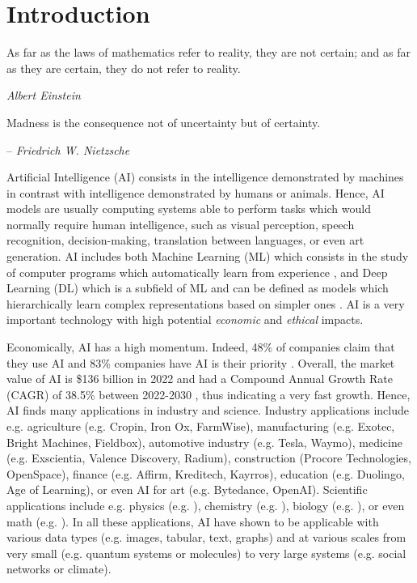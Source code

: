 \chapter{Introduction}
\label{chap:introduction}

\epigraph{As far as the laws of mathematics refer to reality, they are not certain; and as far as they are certain, they do not refer to reality.}{\textit{Albert Einstein}}

\epigraph{Madness is the consequence not of uncertainty but of certainty.}{-- \textit{Friedrich W. Nietzsche}}

Artificial Intelligence (AI) consists in the intelligence demonstrated by machines in contrast with intelligence demonstrated by humans or animals. 
Hence, AI models are usually computing systems able to perform tasks which would normally require human intelligence, such as visual perception, speech recognition, decision-making, translation between languages, or even art generation.
AI includes both Machine Learning (ML) which consists in the study of computer programs which automatically learn from experience \citep{Mitchell97}, and Deep Learning (DL) which is a subfield of ML and can be defined as models which hierarchically learn complex representations based on simpler ones \citep{GoodBengCour16}.
AI is a very important technology with high potential \emph{economic} and \emph{ethical} impacts. 

Economically, AI has a high momentum. Indeed, 48\% of companies claim that they use AI \cite{ai-market-oreilly} and 83\% companies have AI is their priority \cite{ai-market-forbes}. Overall, the market value of AI is \$136 billion in 2022 \cite{ai-market} and had a Compound Annual Growth Rate (CAGR) of 38.5\% between 2022-2030 \cite{ai-market}, thus indicating a very fast growth.
Hence, AI finds many applications in industry and science. 
Industry applications include e.g. agriculture (e.g. Cropin, Iron Ox, FarmWise), manufacturing (e.g. Exotec, Bright Machines, Fieldbox), automotive industry (e.g. Tesla, Waymo), medicine (e.g. Exscientia, Valence Discovery, Radium), construction (Procore Technologies, OpenSpace), finance (e.g. Affirm, Kreditech, Kayrros), education (e.g. Duolingo, Age of Learning), or even AI for art (e.g. Bytedance, OpenAI).
Scientific applications include e.g. physics (e.g. \cite{gao2022abinitio}), chemistry (e.g. \cite{huang2021abinitio}), biology (e.g. \cite{hetzel2022predicting}), or even math (e.g. \cite{cobbe2021math}).
In all these applications, AI have shown to be applicable with various data types (e.g. images, tabular, text, graphs) and at various scales from very small (e.g. quantum systems or molecules) to very large systems (e.g. social networks or climate).

